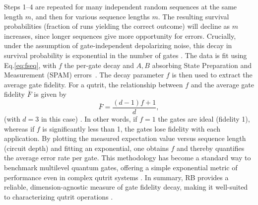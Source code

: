 Steps 1–4 are repeated for many independent random sequences at the same length $m$, and then for various sequence lengths $m$. The resulting survival probabilities (fraction of runs yielding the correct outcome) will decline as $m$ increases, since longer sequences give more opportunity for errors. Crucially, under the assumption of gate-independent depolarizing noise, this decay in survival probability is exponential in the number of gates \cite{Magesan2011PRL}. The data is fit using Eq.\eqref{eq:fseq}, with $f$ the per-gate decay and $A,B$ absorbing State Preparation and Measurement (SPAM) errors~\cite{Magesan2011PRL,Magesan2012PRA}.
 The decay parameter $f$ is then used to extract the average gate fidelity. For a qutrit, the relationship between $f$ and the average gate fidelity $\bar{F}$ is given by
\begin{equation}
\bar{F} = \frac{(d-1)f + 1}{d},
\label{eq:fbar}
\end{equation}
(with $d=3$ in this case) \cite{Nielsen2002,Magesan2012PRA}. In other words, if $f=1$ the gates are ideal (fidelity 1), whereas if $f$ is significantly less than 1, the gates lose fidelity with each application. By plotting the measured expectation value versus sequence length (circuit depth) and fitting an exponential, one obtains $f$ and thereby quantifies the average error rate per gate. This methodology has become a standard way to benchmark multilevel quantum gates, offering a simple exponential metric of performance even in complex qutrit systems \cite{Morvan2021,Proctor2019DRB}. In summary, RB provides a reliable, dimension-agnostic measure of gate fidelity decay, making it well-suited to characterizing qutrit operations \cite{Magesan2011PRL,Magesan2012PRA}.